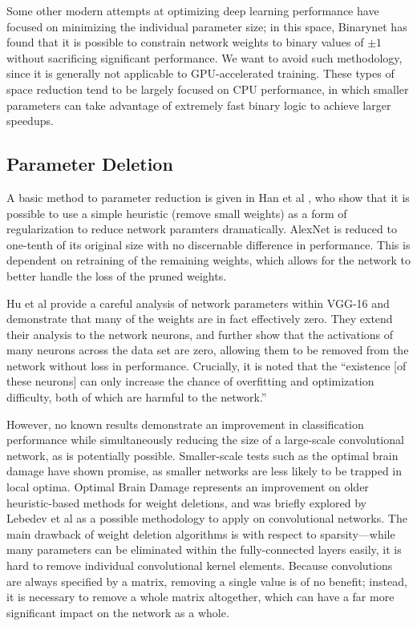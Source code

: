 \documentclass[12pt]{article}
\begin{document}
Some other modern attempts at optimizing deep learning performance have focused on minimizing the individual parameter size; in this space, Binarynet \cite{courbariaux2016binarynet} has found that it is possible to constrain network weights to binary values of $\pm 1$ without sacrificing significant performance.
We want to avoid such methodology, since it is generally not applicable to GPU-accelerated training.
These types of space reduction tend to be largely focused on CPU performance, in which smaller parameters can take advantage of extremely fast binary logic to achieve larger speedups.

\subsection{Parameter Deletion}
A basic method to parameter reduction is given in Han et al \cite{han2015learning}, who show that it is possible to use a simple heuristic (remove small weights) as a form of regularization to reduce network paramters dramatically.
AlexNet is reduced to one-tenth of its original size with no discernable difference in performance.
This is dependent on retraining of the remaining weights, which allows for the network to better handle the loss of the pruned weights.

Hu et al \cite{hu2016network} provide a careful analysis of network parameters within VGG-16 and demonstrate that many of the weights are in fact effectively zero.
They extend their analysis to the network neurons, and further show that the activations of many neurons across the data set are zero, allowing them to be removed from the network without loss in performance.
Crucially, it is noted that the ``existence [of these neurons] can only increase the chance of overfitting and optimization difficulty, both of which are harmful to the network.''

However, no known results demonstrate an improvement in classification performance while simultaneously reducing the size of a large-scale convolutional network, as is potentially possible.
Smaller-scale tests such as the optimal brain damage \cite{lecun1989optimal} have shown promise, as smaller networks are less likely to be trapped in local optima.
Optimal Brain Damage represents an improvement on older heuristic-based methods for weight deletions, and was briefly explored by Lebedev et al \cite{lebedev2016fast} as a possible methodology to apply on convolutional networks.
The main drawback of weight deletion algorithms is with respect to sparsity---while many parameters can be eliminated within the fully-connected layers easily, it is hard to remove individual convolutional kernel elements.
Because convolutions are always specified by a matrix, removing a single value is of no benefit; instead, it is necessary to remove a whole matrix altogether, which can have a far more significant impact on the network as a whole.
\end{document}
